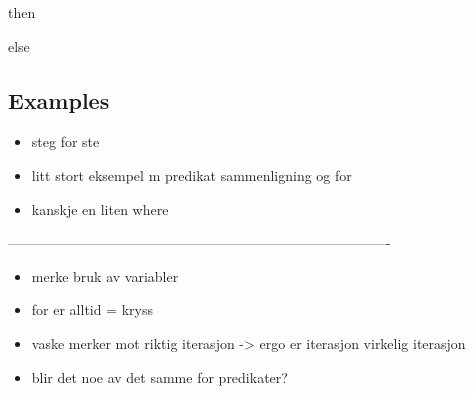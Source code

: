 then

else

\subsection{Examples}
\label{sect:translation:markxremoveExamples}
\begin{itemize}
\item steg for ste
\item litt stort eksempel m predikat sammenligning og for
\item kanskje en liten where
\end{itemize}
----------------------------------------------------------------------------------

\begin{itemize}
\item merke bruk av variabler
\item for er alltid = kryss
\item vaske merker mot riktig iterasjon -> ergo er iterasjon virkelig iterasjon
\item blir det noe av det samme for predikater?
\end{itemize}